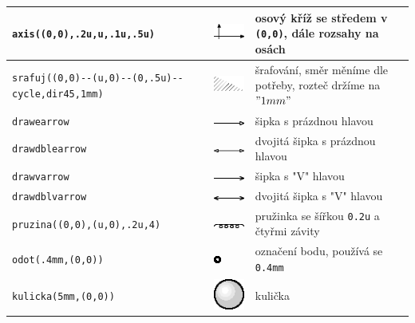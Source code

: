 \documentclass[a4paper,10pt]{article}
\begin{document}
\begin{tabularx}{\textwidth}{|l|l|X|}
	\\\hline
    \verb+axis((0,0),.2u,u,.1u,.5u)+ & \includegraphics{mp_fks_6}&
	osový kříž se středem v {\tt (0,0)}, dále rozsahy na osách\\\hline 
    \verb+srafuj((0,0)--(u,0)--(0,.5u)--cycle,dir45,1mm)+ & 
      \raise-12pt\hbox{\includegraphics{mp_fks_7}}&
	šrafování, směr měníme dle potřeby, rozteč držíme na $"1 mm"$\\\hline 
    \verb+drawearrow+ & \includegraphics{mp_fks_8}&
	šipka s prázdnou hlavou\\\hline
    \verb+drawdblearrow+ & \includegraphics{mp_fks_9}&
	dvojitá šipka s prázdnou hlavou\\\hline
    \verb+drawvarrow+ & \includegraphics{mp_fks_10}&
	šipka s "V" hlavou\\\hline
    \verb+drawdblvarrow+ & \includegraphics{mp_fks_11}&
	dvojitá šipka s "V" hlavou\\\hline
    \verb+pruzina((0,0),(u,0),.2u,4)+ & \includegraphics{mp_fks_12}&
	pružinka se šířkou {\tt 0.2u} a čtyřmi závity\\\hline
    \verb+odot(.4mm,(0,0))+ & \includegraphics{mp_fks_13}&
	označení bodu, používá se {\tt 0.4mm}\\\hline
    \verb+kulicka(5mm,(0,0))+ & \includegraphics{mp_fks_14}&
	kulička\\\hline

\end{tabularx}
\end{document}
